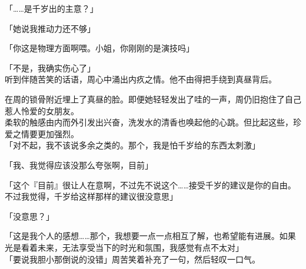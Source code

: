 「……是千岁出的主意？」

「她说我推动力还不够」

「你这是物理方面啊喂。小姐，你刚刚的是演技吗」

「不是，我确实伤心了」\\

听到伴随苦笑的话语，周心中涌出内疚之情。他不由得把手绕到真昼背后。

在周的锁骨附近埋上了真昼的脸。即便她轻轻发出了哇的一声，周仍旧抱住了自己惹人怜爱的女朋友。\\

柔软的触感由内而外引发出兴奋，洗发水的清香也唤起他的心跳。但比起这些，珍爱之情要更加强烈。\\

「对不起，我不该说多余之类的。那个，我是怕千岁给的东西太刺激」

「我、我觉得应该没那么夸张啊，目前」

「这个『目前』很让人在意啊，不过先不说这个……接受千岁的建议是你的自由。不过我觉得，千岁给这样那样的建议很没意思」

「没意思？」

「这是我个人的感想……那个，我想要一点一点相互了解，也希望能有进展。如果光是看着未来，无法享受当下的时光和氛围，我感觉有点不太对」\\

「要说我胆小那倒说的没错」周苦笑着补充了一句，然后轻叹一口气。\\

